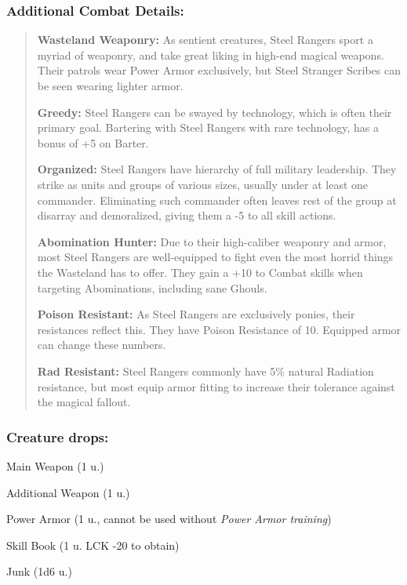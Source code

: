 \documentclass[11pt,a4paper,twocolumn]{book}
\begin{document}
	\subsubsection*{Additional Combat Details:}
	\begin{verse}
		\textbf{Wasteland Weaponry:} As sentient creatures, Steel Rangers sport a myriad of weaponry, and take great liking in high-end magical weapons. Their patrols wear Power Armor exclusively, but Steel Stranger Scribes can be seen wearing lighter armor. 
		
		\textbf{Greedy:} Steel Rangers can be swayed by technology, which is often their primary goal. Bartering with Steel Rangers with rare technology, has a bonus of +5 on Barter.
		
		\textbf{Organized:} Steel Rangers have hierarchy of full military leadership. They strike as units and groups of various sizes, usually under at least one commander. Eliminating such commander often leaves rest of the  group at disarray and demoralized, giving them a -5 to all skill actions.
		
		\textbf{Abomination Hunter:} Due to their high-caliber weaponry and armor, most Steel Rangers are well-equipped to fight even the most horrid things the Wasteland has to offer. They gain a +10 to Combat skills when targeting Abominations, including sane Ghouls.
		
		\textbf{Poison Resistant:} As Steel Rangers are exclusively ponies, their resistances reflect this. They have Poison Resistance of 10. Equipped armor can change these numbers.
		
		\textbf{Rad Resistant:} Steel Rangers commonly have 5\% natural Radiation resistance, but most equip armor fitting to increase their tolerance against the magical fallout.
	\end{verse}
	
	\subsubsection*{Creature drops:}
	\begin{compactitem}
		\item Main Weapon (1 u.)
		\item Additional Weapon (1 u.)
		\item Power Armor (1 u., cannot be used without \emph{Power Armor training})
		\item Skill Book (1 u. LCK -20 to obtain)
		\item Junk (1d6 u.)
	\end{compactitem}
	
\end{document}
